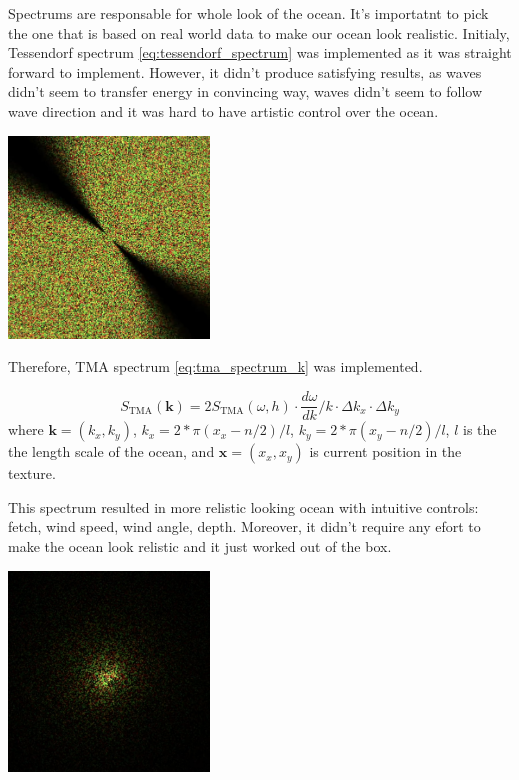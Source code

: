 Spectrums are responsable for whole look of the ocean. It's importatnt to pick the one that is based on real world data to make our ocean look realistic.
Initialy, Tessendorf spectrum \ref{eq:tessendorf_spectrum} was implemented as it was straight forward to implement. However, it didn't produce satisfying results, as waves didn't seem to transfer energy in convincing way, waves didn't seem to follow wave direction and it was hard to have artistic control over the ocean.

\begin{minipage}{1\textwidth}
    \centering
    \includegraphics[width=0.4\textwidth]{"images/phillips_spectrum.png"}
    \label{fig:phillips_spectrum}
\end{minipage}

Therefore, TMA spectrum \ref{eq:tma_spectrum_k} was implemented.

$$
    S_{\text{TMA}}(\mathbf{k}) = 2S_{\text{TMA}}(\omega, h) \cdot \frac{d\omega}{dk} / k \cdot \Delta k_x \cdot \Delta k_y
$$
where $\mathbf{k} = (k_x, k_y)$, $k_x = 2 * \pi (x_x - n/2)/ l$, $k_y = 2 * \pi (x_y - n/2)/ l$, $l$ is the the length scale of the ocean, 
and $\mathbf{x} = (x_x, x_y)$ is current position in the texture. 

This spectrum resulted in more relistic looking ocean with intuitive controls: fetch, wind speed, wind angle, depth. Moreover, it didn't require any efort to make the ocean look relistic and it just worked out of the box.

\begin{minipage}{1\textwidth}
    \centering
    \includegraphics[width=0.40\textwidth]{"images/tma_spectrum.png"}
    \label{fig:tma_spectrum}
\end{minipage}

